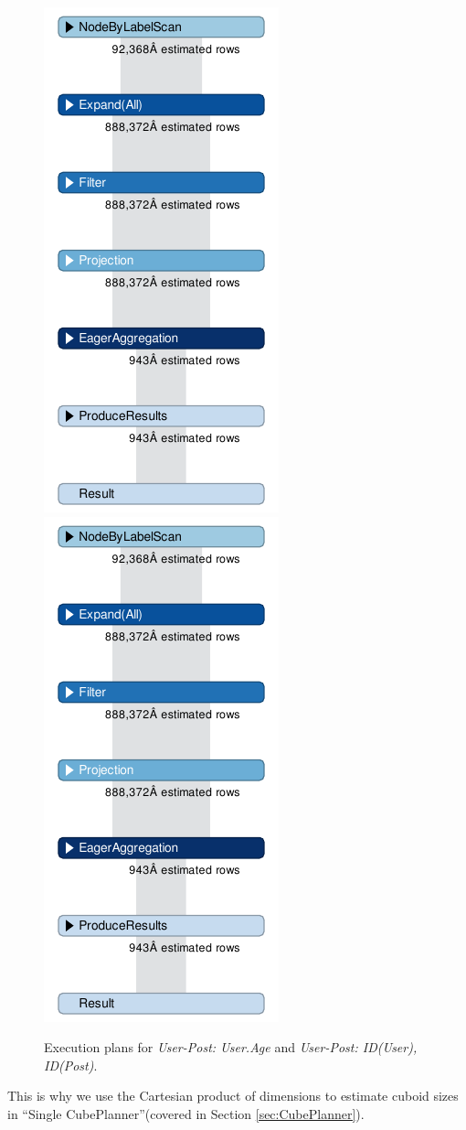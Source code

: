 \begin{figure}[H]
	\centering
	\includegraphics[scale=1.5]{pic/wrong.pdf}
	\includegraphics[scale=1.5]{pic/wrong2.pdf}
	\caption{Execution plans for \textit{User-Post: User.Age} and \textit{User-Post: ID(User), ID(Post)}.}
	\label{fig:wrong1}
\end{figure}

This is why we use the Cartesian product of dimensions to estimate cuboid sizes in ``Single CubePlanner''(covered in Section \ref{sec:CubePlanner}).
